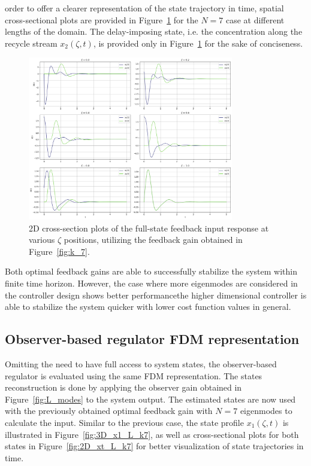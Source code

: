 \DIFdelbegin {}\DIFdelend \DIFaddbegin {}\DIFaddend order to offer a clearer representation of the state trajectory in time, spatial cross-sectional plots are provided in Figure~\ref{fig:2D_xt_k7} for the $N=7$ case at different lengths of the domain. The delay-imposing state, i.e. the concentration along the recycle stream $x_2(\zeta,t)$, is provided only in Figure~\ref{fig:2D_xt_k7} for the sake of conciseness.

\begin{figure}[!htbp]
    \centering
    \includegraphics[width=0.8\textwidth]{Figures/2D_xt_k7.png}
    \caption{2D cross-section plots of the full-state feedback input response at various $\zeta$ positions, utilizing the feedback gain obtained in Figure~\ref{fig:k_7}.}
    \label{fig:2D_xt_k7}
\end{figure}

Both optimal feedback gains are able to successfully stabilize the system within finite time horizon. However, the case where more eigenmodes are considered in the controller design shows better performance\DIFdelbegin {}\DIFdelend \DIFaddbegin {}\DIFaddend the higher dimensional controller is able to stabilize the system quicker with lower cost function values in general.

\subsection{Observer-based regulator FDM representation} \DIFaddbegin \label{sec:observer}
\DIFaddend 

Omitting the need to have full access to system states, the observer-based regulator is evaluated using the same FDM representation. The states reconstruction is done by applying the observer gain obtained in Figure~\ref{fig:L_modes} to the system output. The estimated states are now used with the previously obtained optimal feedback gain with $N=7$ eigenmodes to calculate the input. Similar to the previous case, the state profile $x_1(\zeta,t)$ is illustrated in Figure~\ref{fig:3D_x1_L_k7}, as well as cross-sectional plots for both states in Figure~\ref{fig:2D_xt_L_k7} for better visualization of state trajectories in time.

